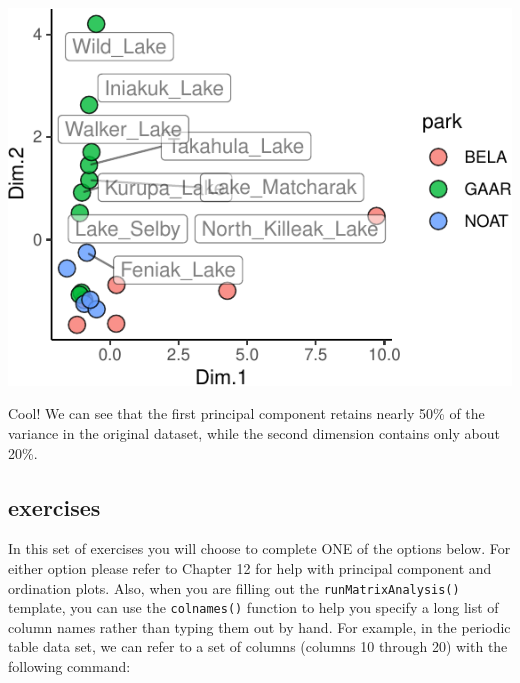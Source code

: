 \documentclass[
]{krantz}
\begin{document}
\begin{center}\includegraphics{index_files/figure-latex/unnamed-chunk-98-1} \end{center}

Cool! We can see that the first principal component retains nearly 50\% of the variance in the original dataset, while the second dimension contains only about 20\%.

\hypertarget{exercises-4}{%
\subsection{exercises}\label{exercises-4}}

In this set of exercises you will choose to complete ONE of the options below. For either option please refer to Chapter 12 for help with principal component and ordination plots. Also, when you are filling out the \texttt{runMatrixAnalysis()} template, you can use the \texttt{colnames()} function to help you specify a long list of column names rather than typing them out by hand. For example, in the periodic table data set, we can refer to a set of columns (columns 10 through 20) with the following command:
\end{document}
